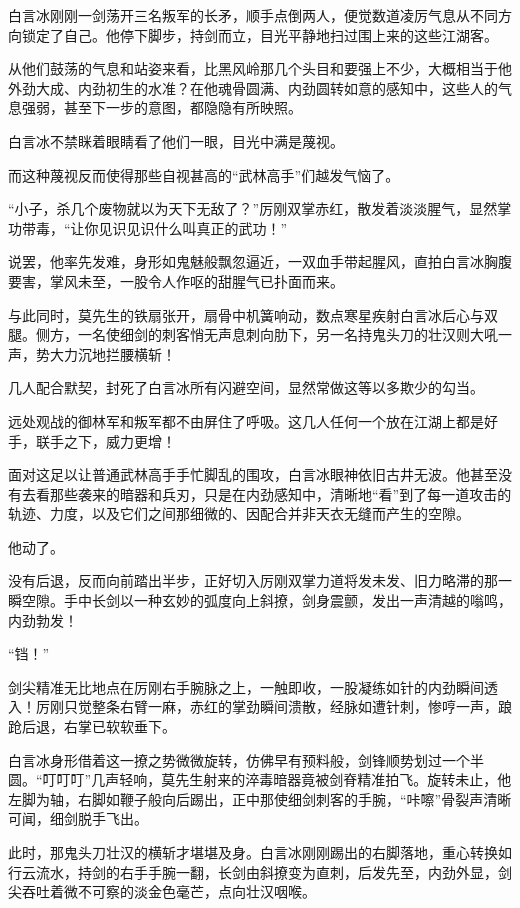 白言冰刚刚一剑荡开三名叛军的长矛，顺手点倒两人，便觉数道凌厉气息从不同方向锁定了自己。他停下脚步，持剑而立，目光平静地扫过围上来的这些江湖客。

从他们鼓荡的气息和站姿来看，比黑风岭那几个头目和要强上不少，大概相当于他外劲大成、内劲初生的水准？在他魂骨圆满、内劲圆转如意的感知中，这些人的气息强弱，甚至下一步的意图，都隐隐有所映照。

白言冰不禁眯着眼睛看了他们一眼，目光中满是蔑视。

而这种蔑视反而使得那些自视甚高的“武林高手”们越发气恼了。

“小子，杀几个废物就以为天下无敌了？”厉刚双掌赤红，散发着淡淡腥气，显然掌功带毒，“让你见识见识什么叫真正的武功！”

说罢，他率先发难，身形如鬼魅般飘忽逼近，一双血手带起腥风，直拍白言冰胸腹要害，掌风未至，一股令人作呕的甜腥气已扑面而来。

与此同时，莫先生的铁扇张开，扇骨中机簧响动，数点寒星疾射白言冰后心与双腿。侧方，一名使细剑的刺客悄无声息刺向肋下，另一名持鬼头刀的壮汉则大吼一声，势大力沉地拦腰横斩！

几人配合默契，封死了白言冰所有闪避空间，显然常做这等以多欺少的勾当。

远处观战的御林军和叛军都不由屏住了呼吸。这几人任何一个放在江湖上都是好手，联手之下，威力更增！

面对这足以让普通武林高手手忙脚乱的围攻，白言冰眼神依旧古井无波。他甚至没有去看那些袭来的暗器和兵刃，只是在内劲感知中，清晰地“看”到了每一道攻击的轨迹、力度，以及它们之间那细微的、因配合并非天衣无缝而产生的空隙。

他动了。

没有后退，反而向前踏出半步，正好切入厉刚双掌力道将发未发、旧力略滞的那一瞬空隙。手中长剑以一种玄妙的弧度向上斜撩，剑身震颤，发出一声清越的嗡鸣，内劲勃发！

“铛！”

剑尖精准无比地点在厉刚右手腕脉之上，一触即收，一股凝练如针的内劲瞬间透入！厉刚只觉整条右臂一麻，赤红的掌劲瞬间溃散，经脉如遭针刺，惨哼一声，踉跄后退，右掌已软软垂下。

白言冰身形借着这一撩之势微微旋转，仿佛早有预料般，剑锋顺势划过一个半圆。“叮叮叮”几声轻响，莫先生射来的淬毒暗器竟被剑脊精准拍飞。旋转未止，他左脚为轴，右脚如鞭子般向后踢出，正中那使细剑刺客的手腕，“咔嚓”骨裂声清晰可闻，细剑脱手飞出。

此时，那鬼头刀壮汉的横斩才堪堪及身。白言冰刚刚踢出的右脚落地，重心转换如行云流水，持剑的右手手腕一翻，长剑由斜撩变为直刺，后发先至，内劲外显，剑尖吞吐着微不可察的淡金色毫芒，点向壮汉咽喉。

